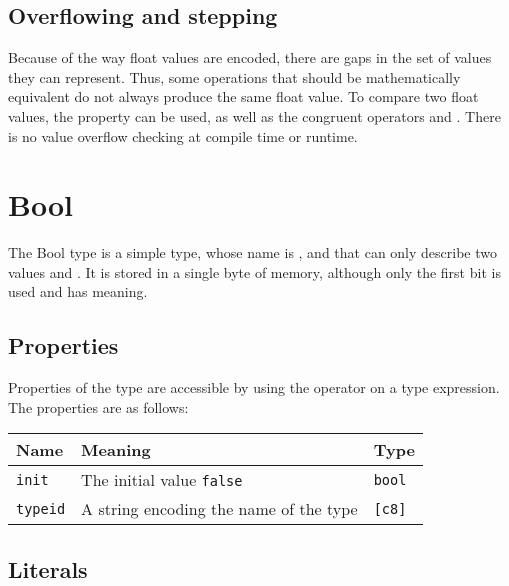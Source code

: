 \subsection{Overflowing and stepping}
\label{sec:orgd5d9f51}

Because of the way float values are encoded, there are gaps in the set of values
they can represent. Thus, some operations that should be mathematically
equivalent do not always produce the same float value. To compare two float
values, the property  can be used, as well as the congruent
operators \token{<=>} and \token{<!>}. There is no value overflow checking
at compile time or runtime.

\section{Bool}
\label{sec:org9f3a743}

The Bool type is a simple type, whose name is , and that can only
describe two values  and . It is stored in a single
byte of memory, although only the first bit is used and has meaning.

\subsection{Properties}
\label{sec:org503bc9e}

Properties of the type  are accessible by using the operator
\token{::} on a type expression. The properties are as follows:

\begin{center}
  \vspace{-5pt}
  \begin{adjustbox}{max width=\linewidth}
    \begin{tabular}{|l|ll|}
      \hline
      Name & Meaning & Type\\[0pt]
      \hline
      \hline
      \texttt{init} & The initial value \texttt{false} & \texttt{bool}\\[0pt]
      \hline
      \texttt{typeid} & A string encoding the name of the type & \texttt{[c8]}\\[0pt]
      \hline
    \end{tabular}
  \end{adjustbox}
\end{center}

\subsection{Literals}
\label{sec:org7620b9c}

